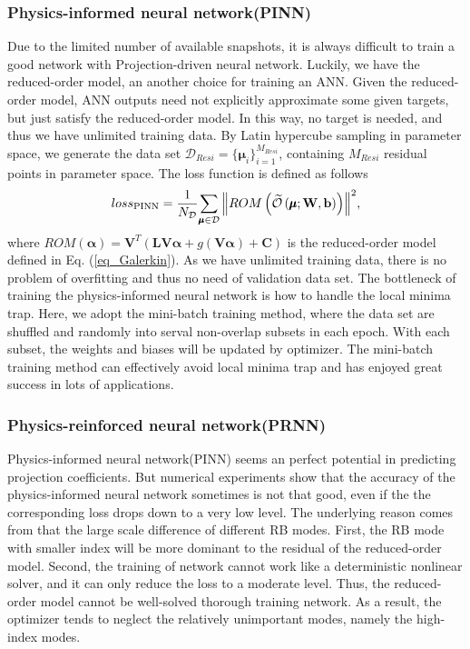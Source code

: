 \documentclass[preprint, 10pt]{elsarticle}
\begin{document}
\subsubsection{Physics-informed neural network(PINN)}
Due to the limited number of available snapshots, it is always difficult to train a good network with Projection-driven neural network. Luckily, we have the reduced-order model, an another choice for training an ANN. Given the reduced-order model, ANN outputs need not explicitly approximate some given targets, but just satisfy the reduced-order model. In this way, no target is needed, and thus we have unlimited training data. By Latin hypercube sampling in parameter space, we generate the data set $\mathcal{D}_{Resi}=\{ \pmb{\mu}_i\}_{i=1}^{M_{Resi}}$, containing $M_{Resi}$ residual points in parameter space. The loss function is defined as follows
\begin{equation}
{loss}_{\rm{PINN}} = \frac{1}{N_{\cal D}}
{{\sum\limits_{\pmb\mu  \in {\cal D}}
{ \left\|
ROM \left(\widetilde {\cal O}\left( {\pmb\mu ;{\bf{W}},{\bf{b}}} \right) \right)
\right \|^2}
}},
\end{equation}
where $ROM(\pmb{\alpha})=\mathbf{V}^T
\left(
 \mathbf{L} \mathbf{V} \pmb{\alpha}
+ g         \left( \mathbf{V} \pmb{\alpha} \right)
+\mathbf{C}
\right)$
is the reduced-order model defined in Eq. (\ref{eq_Galerkin}).
As we have unlimited training data, there is no problem of overfitting and thus no need of validation data set.  The bottleneck of training the physics-informed neural network is how to handle the local minima trap. Here, we adopt the mini-batch training method, where the data set are shuffled and randomly into serval non-overlap subsets in each epoch. With each subset, the weights and biases will be updated by optimizer. The mini-batch training method can effectively avoid local minima trap and has enjoyed great success in lots of applications.

\subsubsection{Physics-reinforced neural network(PRNN)}
\label{PRNN}
Physics-informed neural network(PINN) seems an perfect potential in predicting projection coefficients. But numerical experiments show that  the accuracy of the physics-informed neural network sometimes is not that good, even if the the corresponding loss drops down to a very low level. The underlying reason comes from that the large scale difference of different RB modes.
First, the RB mode with smaller index will be more dominant to the residual of the reduced-order model. Second, the training of network cannot work like a deterministic nonlinear solver, and it can only reduce the loss to a moderate level. Thus, the reduced-order model cannot be well-solved thorough training network. As a result, the optimizer tends to neglect the relatively unimportant modes, namely the high-index modes.
\end{document}
